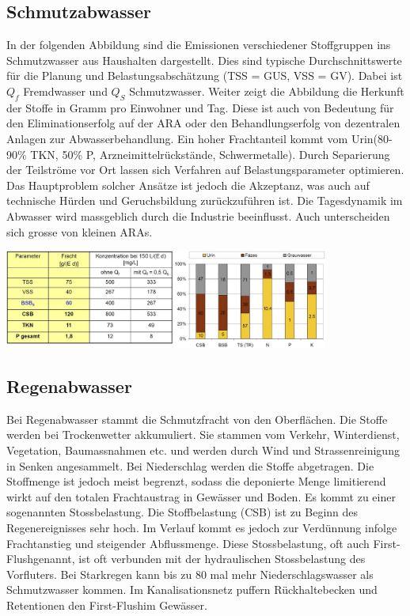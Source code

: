 \documentclass[9pt, openright=false]{scrartcl}
\begin{document}
\subsection{Schmutzabwasser}
In der folgenden Abbildung sind die Emissionen verschiedener Stoffgruppen ins Schmutzwasser aus Haushalten dargestellt. Dies sind typische Durchschnittswerte für die Planung und Belastungsabschätzung (TSS = GUS, VSS = GV). Dabei ist $Q_f$ Fremdwasser und $Q_S$ Schmutzwasser. Weiter zeigt die Abbildung die Herkunft der Stoffe in Gramm pro Einwohner und Tag. Diese ist auch von Bedeutung für den Eliminationserfolg auf der ARA oder den Behandlungserfolg von dezentralen Anlagen zur Abwasserbehandlung. Ein hoher Frachtanteil kommt vom Urin(80-90\% TKN, 50\% P, Arzneimittelrückstände, Schwermetalle). Durch Separierung der Teilströme vor Ort lassen sich Verfahren auf Belastungsparameter optimieren. Das Hauptproblem solcher Ansätze ist jedoch die Akzeptanz, was auch auf technische Hürden und Geruchsbildung zurückzuführen ist. Die Tagesdynamik im Abwasser wird massgeblich durch die Industrie beeinflusst. Auch unterscheiden sich grosse von kleinen ARAs.
\begin{center}
\includegraphics[width=0.8\textwidth]{images/schmutzfracht}
\end{center}     
\subsection{Regenabwasser}
Bei Regenabwasser stammt die Schmutzfracht von den Oberflächen. Die Stoffe werden bei Trockenwetter akkumuliert. Sie stammen vom Verkehr, Winterdienst, Vegetation, Baumassnahmen etc. und werden durch Wind und Strassenreinigung in Senken angesammelt. Bei Niederschlag werden die Stoffe abgetragen. Die Stoffmenge ist jedoch meist begrenzt, sodass die deponierte Menge limitierend wirkt auf den totalen Frachtaustrag in Gewässer und Boden. Es kommt zu einer sogenannten Stossbelastung. Die Stoffbelastung (CSB) ist zu Beginn des Regenereignisses sehr hoch. Im Verlauf kommt es jedoch zur Verdünnung infolge Frachtanstieg und steigender Abflussmenge. Diese Stossbelastung, oft auch \glqq First-Flush\grqq genannt, ist oft verbunden mit der hydraulischen Stossbelastung des Vorfluters. Bei Starkregen kann bis zu 80 mal mehr Niederschlagswasser als Schmutzwasser kommen. Im Kanalisationsnetz puffern Rückhaltebecken und Retentionen den \glqq First-Flush\grqq im Gewässer.
\end{document}
